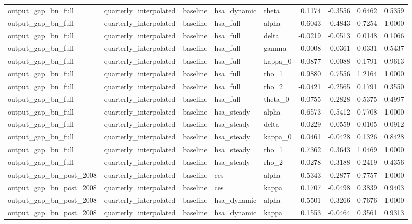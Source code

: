 \begin{tabular}{lllllrrrr}
output\_gap\_bn\_full & quarterly\_interpolated & baseline & hsa\_dynamic & theta & 0.1174 & -0.3556 & 0.6462 & 0.5359 \\
output\_gap\_bn\_full & quarterly\_interpolated & baseline & hsa\_full & alpha & 0.6043 & 0.4843 & 0.7254 & 1.0000 \\
output\_gap\_bn\_full & quarterly\_interpolated & baseline & hsa\_full & delta & -0.0219 & -0.0513 & 0.0148 & 0.1066 \\
output\_gap\_bn\_full & quarterly\_interpolated & baseline & hsa\_full & gamma & 0.0008 & -0.0361 & 0.0331 & 0.5437 \\
output\_gap\_bn\_full & quarterly\_interpolated & baseline & hsa\_full & kappa\_0 & 0.0877 & -0.0088 & 0.1791 & 0.9613 \\
output\_gap\_bn\_full & quarterly\_interpolated & baseline & hsa\_full & rho\_1 & 0.9880 & 0.7556 & 1.2164 & 1.0000 \\
output\_gap\_bn\_full & quarterly\_interpolated & baseline & hsa\_full & rho\_2 & -0.0421 & -0.2565 & 0.1791 & 0.3550 \\
output\_gap\_bn\_full & quarterly\_interpolated & baseline & hsa\_full & theta\_0 & 0.0755 & -0.2828 & 0.5375 & 0.4997 \\
output\_gap\_bn\_full & quarterly\_interpolated & baseline & hsa\_steady & alpha & 0.6573 & 0.5412 & 0.7708 & 1.0000 \\
output\_gap\_bn\_full & quarterly\_interpolated & baseline & hsa\_steady & delta & -0.0229 & -0.0559 & 0.0105 & 0.0912 \\
output\_gap\_bn\_full & quarterly\_interpolated & baseline & hsa\_steady & kappa\_0 & 0.0461 & -0.0428 & 0.1326 & 0.8428 \\
output\_gap\_bn\_full & quarterly\_interpolated & baseline & hsa\_steady & rho\_1 & 0.7362 & 0.3643 & 1.0469 & 1.0000 \\
output\_gap\_bn\_full & quarterly\_interpolated & baseline & hsa\_steady & rho\_2 & -0.0278 & -0.3188 & 0.2419 & 0.4356 \\
output\_gap\_bn\_post\_2008 & quarterly\_interpolated & baseline & ces & alpha & 0.5343 & 0.2877 & 0.7757 & 1.0000 \\
output\_gap\_bn\_post\_2008 & quarterly\_interpolated & baseline & ces & kappa & 0.1707 & -0.0498 & 0.3839 & 0.9403 \\
output\_gap\_bn\_post\_2008 & quarterly\_interpolated & baseline & hsa\_dynamic & alpha & 0.5501 & 0.3266 & 0.7676 & 1.0000 \\
output\_gap\_bn\_post\_2008 & quarterly\_interpolated & baseline & hsa\_dynamic & kappa & 0.1553 & -0.0464 & 0.3561 & 0.9313 \\

\end{tabular}
